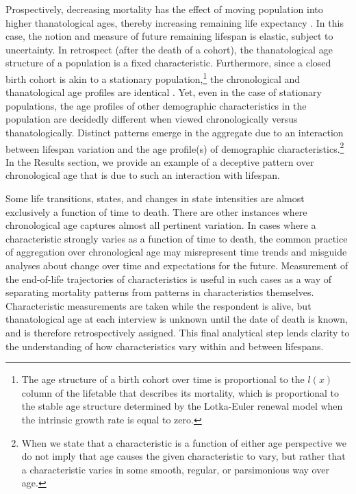 \documentclass[11pt,oneside]{article} %
\begin{document}
Prospectively, decreasing mortality has the effect of moving population into higher thanatological ages, thereby increasing
remaining life expectancy \citep{sanderson2005average}. In this case,
the notion and measure of future remaining lifespan is elastic, subject to uncertainty.
In retrospect (after the death of a cohort), the thanatological age structure of
a population is a fixed characteristic. Furthermore, since a closed birth cohort
is akin to a stationary population,\footnote{The age structure of a birth cohort over time is proportional to the $l(x)$ column of the lifetable that describes its
mortality, which is proportional to the stable age structure determined by
the Lotka-Euler renewal model when the intrinsic growth rate is equal to zero.}
the chronological and thanatological age profiles are identical
\citep{brouard1989mouvements,vaupel2009life,rao2014generalization}. Yet, even in
the case of stationary populations, the age profiles of other demographic characteristics
in the population are decidedly different when viewed chronologically versus
thanatologically. Distinct patterns emerge in the aggregate due to an interaction between lifespan variation and the age profile(s) of
demographic characteristics.\footnote{When we state that a characteristic is
a function of either age perspective we do not imply that age causes the given characteristic to vary, but rather that a characteristic varies in some smooth, regular, or parsimonious
way over age.} In the Results section, we provide an example of a deceptive
pattern over chronological age that is due to such an interaction with lifespan.

Some life
transitions, states, and changes in state intensities are almost exclusively a
function of time to death. There are other instances where chronological age
captures almost all pertinent variation. In cases where a characteristic strongly varies as a
function of time to death,
the common practice of aggregation over chronological age may misrepresent time
trends and misguide analyses about change over time and expectations for the
future. Measurement of the
end-of-life trajectories of characteristics is useful in such cases as a way of separating
mortality patterns from patterns in characteristics themselves.
Characteristic measurements are taken while the respondent is alive, but
thanatological age at each interview is unknown until the date of death is
known, and is therefore retrospectively assigned. This final analytical step
lends clarity to the understanding of how characteristics vary within and
between lifespans.
\end{document}
